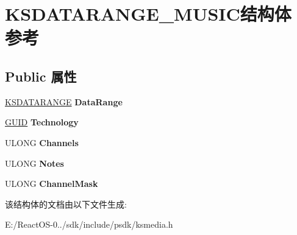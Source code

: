 \hypertarget{struct_k_s_d_a_t_a_r_a_n_g_e___m_u_s_i_c}{}\section{K\+S\+D\+A\+T\+A\+R\+A\+N\+G\+E\+\_\+\+M\+U\+S\+I\+C结构体 参考}
\label{struct_k_s_d_a_t_a_r_a_n_g_e___m_u_s_i_c}
\subsection*{Public 属性}
\begin{DoxyCompactItemize}
\item 
\mbox{\label{struct_k_s_d_a_t_a_r_a_n_g_e___m_u_s_i_c_a44b2581ae1b92e20d41af392cfc87722}} 
\hyperlink{struct_k_s_d_a_t_a_f_o_r_m_a_t}{K\+S\+D\+A\+T\+A\+R\+A\+N\+GE} {\bfseries Data\+Range}
\item 
\mbox{\label{struct_k_s_d_a_t_a_r_a_n_g_e___m_u_s_i_c_a74fe1845e7debcf132cfaf65adebaf62}} 
\hyperlink{interface_g_u_i_d}{G\+U\+ID} {\bfseries Technology}
\item 
\mbox{\label{struct_k_s_d_a_t_a_r_a_n_g_e___m_u_s_i_c_a007463c8c89599bdfd52e7dde7980ea9}} 
U\+L\+O\+NG {\bfseries Channels}
\item 
\mbox{\label{struct_k_s_d_a_t_a_r_a_n_g_e___m_u_s_i_c_a6e8b0449adeee391c4487f92d9b80e9e}} 
U\+L\+O\+NG {\bfseries Notes}
\item 
\mbox{\label{struct_k_s_d_a_t_a_r_a_n_g_e___m_u_s_i_c_a9a2001bfe540df78d935bd559221eecb}} 
U\+L\+O\+NG {\bfseries Channel\+Mask}
\end{DoxyCompactItemize}


该结构体的文档由以下文件生成\+:\begin{DoxyCompactItemize}
\item 
E\+:/\+React\+O\+S-\/0../sdk/include/psdk/ksmedia.\+h\end{DoxyCompactItemize}

